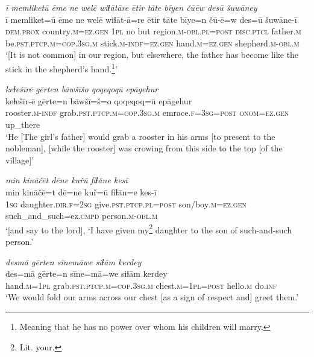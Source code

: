 \ea \label{RE.41}
\textit{ī memliketū ēme ne welē wiɫātāre ētir tāte bīyen čūēw desū šuwāney} \\ 
\gll ī memliket=ū ēme ne welē wiɫāt-ā=re ētir tāte bīye=n čū-ē=w des=ū šuwāne-ī \\ 
 \textsc{dem.prox} country\textsc{.m}\textsc{=ez.gen} \textsc{1pl} no but region\textsc{.m}\textsc{-obl}\textsc{.pl}\textsc{=\textsc{post}} \textsc{disc.ptcl} father\textsc{.m} be\textsc{.pst}\textsc{.ptcp}\textsc{.m}\textsc{=cop}\textsc{.3sg}\textsc{.m} stick\textsc{.m}\textsc{-indf}\textsc{=ez.gen} hand\textsc{.m}\textsc{=ez.gen} shepherd\textsc{.m}\textsc{-obl}\textsc{.m} \\ 
\glt `[It is not common] in our region, but elsewhere, the father has become like the stick in the shepherd’s hand.\footnote{Meaning that he has no power over whom his children will marry.}'
\z 
 
\ea \label{RE.48}
\textit{keɫešīrē gērten bāwšīšo qoqeqoqū epāgehur} \\ 
\gll keɫešīr-ē gērte=n bāwšī=š=o qoqeqoq=ū epāgehur \\ 
 rooster\textsc{.m}\textsc{-indf} grab\textsc{.pst}\textsc{.ptcp}\textsc{.m}\textsc{=cop}\textsc{.3sg}\textsc{.m} emrace\textsc{.f}\textsc{=3sg}\textsc{=\textsc{post}} \textsc{onom}\textsc{=ez.gen} up\_there \\ 
\glt `He [The girl’s father] would grab a rooster in his arms [to present to the nobleman], [while the rooster] was crowing from this side to the top [of the village]'
\z 
 
\ea \label{RE.49}
\textit{min kināčēt dēne kuřū fiɫāne kesī} \\ 
\gll min kināčē=t dē=ne kuř=ū fiɫān=e kes-ī \\ 
 \textsc{1sg} daughter\textsc{.dir}\textsc{.f}\textsc{=\textsc{2sg}} give\textsc{.pst}\textsc{.ptcp}\textsc{.pl}\textsc{=\textsc{post}} son/boy\textsc{.m}\textsc{=ez.gen} such\_and\_such=ez\textsc{.cmpd} person\textsc{.m}\textsc{-obl}\textsc{.m} \\ 
\glt `[and say to the lord], ‘I have given my\footnote{Lit. your.} daughter to the son of such-and-such person.'
\z 
 
\ea \label{RE.68}
\textit{desmā gērten sīnemāwe siɫām kerdey} \\ 
\gll des=mā gērte=n sīne=mā=we siɫām kerdey \\ 
 hand\textsc{.m}\textsc{=\textsc{1pl}} grab\textsc{.pst}\textsc{.ptcp}\textsc{.m}\textsc{=cop}\textsc{.3sg}\textsc{.m} chest\textsc{.m}\textsc{=\textsc{1pl}}\textsc{=\textsc{post}} hello\textsc{.m} do\textsc{.inf} \\ 
\glt `We would fold our arms across our chest [as a sign of respect and] greet them.'
\z 
 
